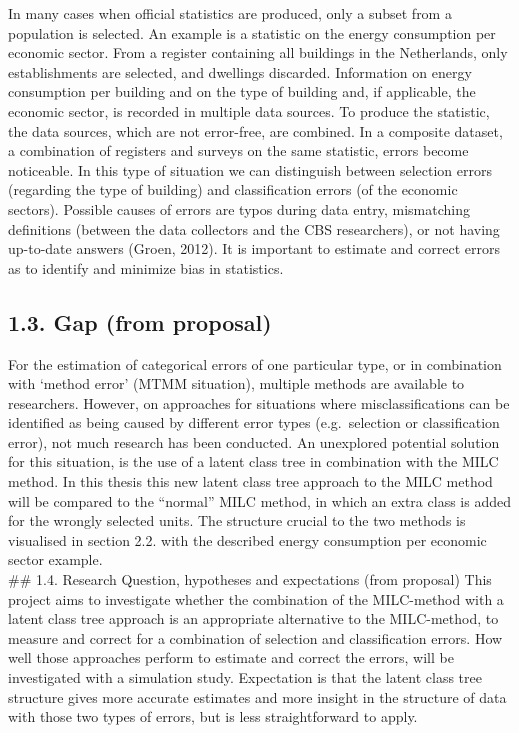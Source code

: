 \documentclass[
]{article}
\begin{document}
In many cases when official statistics are produced, only a subset from
a population is selected. An example is a statistic on the energy
consumption per economic sector. From a register containing all
buildings in the Netherlands, only establishments are selected, and
dwellings discarded. Information on energy consumption per building and
on the type of building and, if applicable, the economic sector, is
recorded in multiple data sources. To produce the statistic, the data
sources, which are not error-free, are combined. In a composite dataset,
a combination of registers and surveys on the same statistic, errors
become noticeable. In this type of situation we can distinguish between
selection errors (regarding the type of building) and classification
errors (of the economic sectors). Possible causes of errors are typos
during data entry, mismatching definitions (between the data collectors
and the CBS researchers), or not having up-to-date answers (Groen,
2012). It is important to estimate and correct errors as to identify and
minimize bias in statistics.

\hypertarget{gap-from-proposal}{%
\subsection{1.3. Gap (from proposal)}\label{gap-from-proposal}}

For the estimation of categorical errors of one particular type, or in
combination with `method error' (MTMM situation), multiple methods are
available to researchers. However, on approaches for situations where
misclassifications can be identified as being caused by different error
types (e.g.~selection or classification error), not much research has
been conducted. An unexplored potential solution for this situation, is
the use of a latent class tree in combination with the MILC method. In
this thesis this new latent class tree approach to the MILC method will
be compared to the ``normal'' MILC method, in which an extra class is
added for the wrongly selected units. The structure crucial to the two
methods is visualised in section 2.2. with the described energy
consumption per economic sector example.\\
\#\# 1.4. Research Question, hypotheses and expectations (from proposal)
This project aims to investigate whether the combination of the
MILC-method with a latent class tree approach is an appropriate
alternative to the MILC-method, to measure and correct for a combination
of selection and classification errors. How well those approaches
perform to estimate and correct the errors, will be investigated with a
simulation study. Expectation is that the latent class tree structure
gives more accurate estimates and more insight in the structure of data
with those two types of errors, but is less straightforward to apply.
\end{document}
